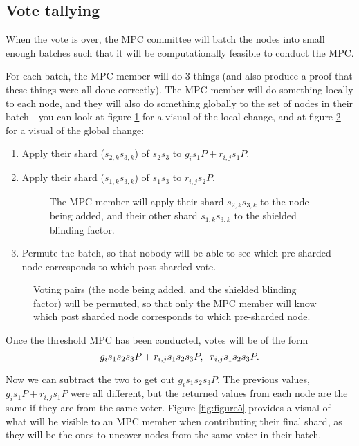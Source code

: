 \documentclass{article}
\begin{document}
\subsection{Vote tallying}
When the vote is over, the MPC committee will batch the nodes into small enough batches such that it will be computationally feasible to conduct the MPC.

For each batch, the MPC member will do 3 things (and also produce a proof that these things were all done correctly). The MPC member will do something locally to each node, and they will also do something globally to the set of nodes in their batch - you can look at figure \ref{fig:figure3} for a visual of the local change, and at figure \ref{fig:figure4} for a visual of the global change:
\begin{enumerate}
    \item Apply their shard ($s_{2,k}s_{3,k}$) of $s_2s_3$ to $g_is_1P+r_{i,j}s_1P$.
    \item Apply their shard ($s_{1,k}s_{3,k}$) of $s_1s_3$ to $r_{i,j}s_2P$.
    \begin{figure}[h!]
        \centering
        
        \caption{The MPC member will apply their shard $s_{2,k}s_{3,k}$ to the node being added, and their other shard $s_{1,k}s_{3,k}$ to the shielded blinding factor.}
        \label{fig:figure3}
    \end{figure}
    \item Permute the batch, so that nobody will be able to see which pre-sharded node corresponds to which post-sharded vote.
\end{enumerate}


\begin{figure}[h!]
        \centering
        
        \caption{Voting pairs (the node being added, and the shielded blinding factor) will be permuted, so that only the MPC member will know which post sharded node corresponds to which pre-sharded node.}
        \label{fig:figure4}
\end{figure}

Once the threshold MPC has been conducted, votes will be of the form
$$ g_is_1s_2s_3P + r_{i,j}s_1s_2s_3P, \hspace{2mm}r_{i,j}s_1s_2s_3P. $$

Now we can subtract the two to get out $g_is_1s_2s_3P$. The previous values, $g_is_1P + r_{i,j}s_1P$ were all different, but the returned values from each node are the same if they are from the same voter. Figure \ref{fig:figure5} provides a visual of what will be visible to an MPC member when contributing their final shard, as they will be the ones to uncover nodes from the same voter in their batch.
\end{document}
